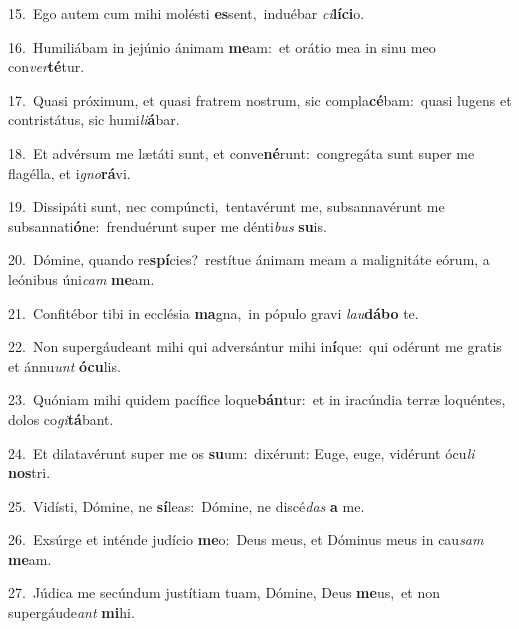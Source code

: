 {\numbfont\textcolor{\numbcolor}{15.}}~Ego autem cum mihi molésti \textbf{es}\-sent,~\star induébar \textit{ci}\-\textbf{lí}\textbf{ci}o.\par
{\numbfont\textcolor{\numbcolor}{16.}}~Humiliábam in jejúnio ánimam \textbf{me}\-am:~\star et orátio mea in sinu meo con\-\textit{ver}\-\textbf{té}tur.\par
{\numbfont\textcolor{\numbcolor}{17.}}~Quasi próximum, et quasi fratrem nostrum, sic compla\-\textbf{cé}\-bam:~\star quasi lugens et contristátus, sic humi\-\textit{li}\-\textbf{á}bar.\par
{\numbfont\textcolor{\numbcolor}{18.}}~Et advérsum me lætáti sunt, et conve\-\textbf{né}\-runt:~\star congregáta sunt super me flagélla, et i\-\textit{gno}\-\textbf{rá}vi.\par
{\numbfont\textcolor{\numbcolor}{19.}}~Dissipáti sunt, nec compúncti,~\dagger tentavérunt me, subsannavérunt me subsannati\-\textbf{ó}\-ne:~\star frenduérunt super me dénti\textit{bus} \textbf{su}\-is.\par
{\numbfont\textcolor{\numbcolor}{20.}}~Dómine, quando re\-\textbf{spí}\-cies?~\star restítue ánimam meam a malignitáte eórum, a leónibus úni\textit{cam} \textbf{me}\-am.\par
{\numbfont\textcolor{\numbcolor}{21.}}~Confitébor tibi in ecclésia \textbf{ma}\-gna,~\star in pópulo gravi \textit{lau}\-\textbf{dá}\textbf{bo} te.\par
{\numbfont\textcolor{\numbcolor}{22.}}~Non supergáudeant mihi qui adversántur mihi in\-\textbf{í}\-que:~\star qui odérunt me gratis et ánnu\textit{unt} \textbf{ó}\-\textbf{cu}lis.\par
{\numbfont\textcolor{\numbcolor}{23.}}~Quóniam mihi quidem pacífice loque\-\textbf{bán}\-tur:~\star et in iracúndia terræ loquéntes, dolos co\-\textit{gi}\-\textbf{tá}bant.\par
{\numbfont\textcolor{\numbcolor}{24.}}~Et dilatavérunt super me os \textbf{su}\-um:~\star dixérunt: Euge, euge, vidérunt ócu\textit{li} \textbf{nos}\-tri.\par
{\numbfont\textcolor{\numbcolor}{25.}}~Vidísti, Dómine, ne \textbf{sí}\-leas:~\star Dómine, ne discé\textit{das} \textbf{a} me.\par
{\numbfont\textcolor{\numbcolor}{26.}}~Exsúrge et inténde judício \textbf{me}\-o:~\star Deus meus, et Dóminus meus in cau\textit{sam} \textbf{me}\-am.\par
{\numbfont\textcolor{\numbcolor}{27.}}~Júdica me secúndum justítiam tuam, Dómine, Deus \textbf{me}\-us,~\star et non supergáude\textit{ant} \textbf{mi}\-hi.\par
